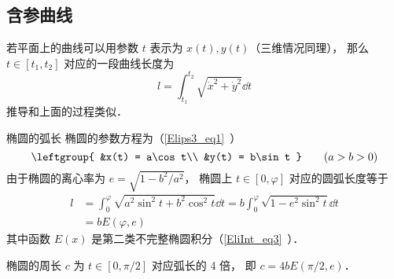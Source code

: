 \subsection{含参曲线}
若平面上的曲线可以用参数 $t$ 表示为 $x(t), y(t)$（三维情况同理）， 那么 $t \in [t_1, t_2]$ 对应的一段曲线长度为
\begin{equation}\label{CurLen_eq2}
l = \int_{t_1}^{t_2} \sqrt{\dot x^2 + \dot y^2} \dd{t}
\end{equation}
推导和上面的过程类似．

\begin{example}{椭圆的弧长}\label{CurLen_ex1}
椭圆的参数方程为（\autoref{Elips3_eq1}~）
\begin{equation}
\leftgroup{
&x(t) = a\cos t\\
&y(t) = b\sin t
} \qquad
(a > b > 0)
\end{equation}
由于椭圆的离心率为 $e = \sqrt{1 - b^2/a^2}$， 椭圆上 $t \in [0, \varphi]$ 对应的圆弧长度等于
\begin{equation}
\begin{aligned}
l &= \int_0^{\varphi} \sqrt{a^2\sin^2 t + b^2 \cos^2 t} \dd{t}
= b\int_0^\varphi \sqrt{1 - e^2\sin^2 t} \dd{t}\\
&= b E(\varphi, e)
\end{aligned}
\end{equation}
其中函数 $E(x)$ 是第二类不完整椭圆积分（\autoref{EliInt_eq3}~）．

椭圆的周长 $c$ 为 $t \in [0, \pi/2]$ 对应弧长的 4 倍， 即 $c = 4bE(\pi/2, e)$．
\end{example}
